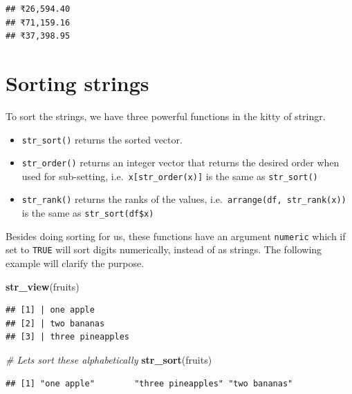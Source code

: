\documentclass[
]{book}
\newenvironment{Shaded}{\begin{snugshade}}{\end{snugshade}}
\newcommand{\CommentTok}[1]{\textcolor[rgb]{0.56,0.35,0.01}{\textit{#1}}}
\newcommand{\FunctionTok}[1]{\textcolor[rgb]{0.13,0.29,0.53}{\textbf{#1}}}
\newcommand{\NormalTok}[1]{#1}
\providecommand{\tightlist}{%
  \setlength{\itemsep}{0pt}\setlength{\parskip}{0pt}}
\begin{document}
\begin{verbatim}
## ₹26,594.40
## ₹71,159.16
## ₹37,398.95
\end{verbatim}

\hypertarget{sorting-strings}{%
\section{Sorting strings}\label{sorting-strings}}

To sort the strings, we have three powerful functions in the kitty of stringr.

\begin{itemize}
\tightlist
\item
  \texttt{str\_sort()} returns the sorted vector.
\item
  \texttt{str\_order()} returns an integer vector that returns the desired order when used for sub-setting, i.e.~\texttt{x{[}str\_order(x){]}} is the same as \texttt{str\_sort()}
\item
  \texttt{str\_rank()} returns the ranks of the values, i.e.~\texttt{arrange(df,\ str\_rank(x))} is the same as \texttt{str\_sort(df\$x)}
\end{itemize}

Besides doing sorting for us, these functions have an argument \texttt{numeric} which if set to \texttt{TRUE} will sort digits numerically, instead of as strings. The following example will clarify the purpose.

\begin{Shaded}
\begin{Highlighting}[]
\FunctionTok{str\_view}\NormalTok{(fruits)}
\end{Highlighting}
\end{Shaded}

\begin{verbatim}
## [1] | one apple
## [2] | two bananas
## [3] | three pineapples
\end{verbatim}

\begin{Shaded}
\begin{Highlighting}[]
\CommentTok{\# Let\textquotesingle{}s sort these alphabetically}
\FunctionTok{str\_sort}\NormalTok{(fruits)}
\end{Highlighting}
\end{Shaded}

\begin{verbatim}
## [1] "one apple"        "three pineapples" "two bananas"
\end{verbatim}
\end{document}
